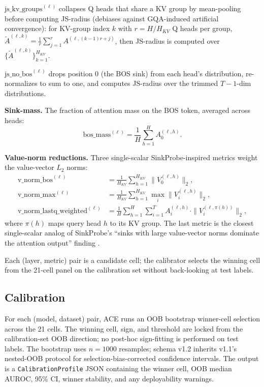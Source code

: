 \documentclass[10pt, letterpaper]{article}
\begin{document}
$\mathrm{js\_kv\_groups}^{(\ell)}$ collapses Q heads that share a KV
group by mean-pooling before computing JS-radius (debiases against
GQA-induced artificial convergence): for KV-group index $k$ with $r =
H/H_{KV}$ Q heads per group, $\tilde{A}^{(\ell,k)} = \tfrac{1}{r}
\sum_{j=1}^{r} A^{(\ell, (k-1)r+j)}$, then JS-radius is computed over
$\{\tilde{A}^{(\ell,k)}\}_{k=1}^{H_{KV}}$.

$\mathrm{js\_no\_bos}^{(\ell)}$ drops position $0$ (the BOS sink)
from each head's distribution, re-normalizes to sum to one, and
computes JS-radius over the trimmed $T{-}1$-dim distributions.

\textbf{Sink-mass.} The fraction of attention mass on the BOS token,
averaged across heads:
\begin{equation}
\mathrm{bos\_mass}^{(\ell)} = \frac{1}{H} \sum_{h=1}^{H} A^{(\ell,h)}_0.
\end{equation}

\textbf{Value-norm reductions.} Three single-scalar SinkProbe-inspired
metrics weight the value-vector $L_2$ norms:
\begin{align}
\mathrm{v\_norm\_bos}^{(\ell)} &= \frac{1}{H_{KV}} \sum_{h=1}^{H_{KV}} \|V^{(\ell,h)}_0\|_2, \\
\mathrm{v\_norm\_max}^{(\ell)} &= \frac{1}{H_{KV}} \sum_{h=1}^{H_{KV}} \max_{i} \|V^{(\ell,h)}_i\|_2, \\
\mathrm{v\_norm\_lastq\_weighted}^{(\ell)} &= \frac{1}{H} \sum_{h=1}^{H} \sum_{i=1}^{T} A^{(\ell,h)}_i \cdot \|V^{(\ell, \pi(h))}_i\|_2,
\end{align}
where $\pi(h)$ maps query head $h$ to its KV group. The last metric
is the closest single-scalar analog of SinkProbe's ``sinks with large
value-vector norms dominate the attention output'' finding
\citep{binkowski2026sinkprobe}.

Each (layer, metric) pair is a candidate cell; the calibrator selects
the winning cell from the 21-cell panel on the calibration set
without back-looking at test labels.

\subsection{Calibration}
\label{sec:method:calibration}

For each (model, dataset) pair, ACE runs an OOB bootstrap winner-cell
selection across the 21 cells. The winning cell, sign, and threshold
are locked from the calibration-set OOB direction; no post-hoc
sign-fitting is performed on test labels. The bootstrap uses
$n{=}1000$ resamples; schema v1.2 inherits v1.1's nested-OOB protocol
for selection-bias-corrected confidence intervals. The output is a
\texttt{CalibrationProfile} JSON containing the winner cell, OOB
median AUROC, 95\% CI, winner stability, and any deployability
warnings.
\end{document}
